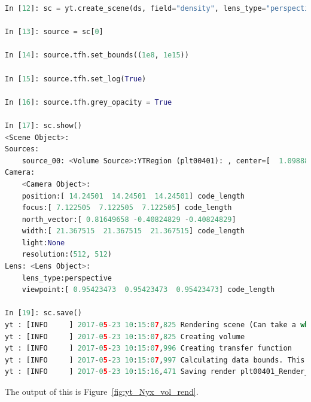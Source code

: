 \begin{lstlisting}[language=python,breaklines=true]
In [12]: sc = yt.create_scene(ds, field="density", lens_type="perspective")

In [13]: source = sc[0]

In [14]: source.tfh.set_bounds((1e8, 1e15))

In [15]: source.tfh.set_log(True)

In [16]: source.tfh.grey_opacity = True

In [17]: sc.show()
<Scene Object>:
Sources:
    source_00: <Volume Source>:YTRegion (plt00401): , center=[  1.09888770e+25   1.09888770e+25   1.09888770e+25] cm, left_edge=[ 0.  0.  0.] cm, right_edge=[  2.19777540e+25   2.19777540e+25   2.19777540e+25] cm transfer_function:None
Camera:
    <Camera Object>:
	position:[ 14.24501  14.24501  14.24501] code_length
	focus:[ 7.122505  7.122505  7.122505] code_length
	north_vector:[ 0.81649658 -0.40824829 -0.40824829]
	width:[ 21.367515  21.367515  21.367515] code_length
	light:None
	resolution:(512, 512)
Lens: <Lens Object>:
	lens_type:perspective
	viewpoint:[ 0.95423473  0.95423473  0.95423473] code_length

In [19]: sc.save()
yt : [INFO     ] 2017-05-23 10:15:07,825 Rendering scene (Can take a while).
yt : [INFO     ] 2017-05-23 10:15:07,825 Creating volume
yt : [INFO     ] 2017-05-23 10:15:07,996 Creating transfer function
yt : [INFO     ] 2017-05-23 10:15:07,997 Calculating data bounds. This may take a while.  Set the TranferFunctionHelper.bounds to avoid this.
yt : [INFO     ] 2017-05-23 10:15:16,471 Saving render plt00401_Render_density.png
\end{lstlisting}

The output of this is Figure~\ref{fig:yt_Nyx_vol_rend}.

